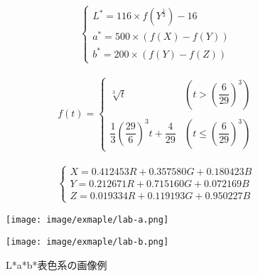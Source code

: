       \begin{eqnarray}
      \label{Lab表色系1}
        \left\{
          \begin{array}{l}
            L^* = 116 \times f(Y^{\frac{1}{3}}) - 16 \\
            a^* = 500 \times (f(X) - f(Y)) \\
            b^* = 200 \times (f(Y) - f(Z))
          \end{array}
        \right.
      \end{eqnarray}

      \begin{eqnarray}
        \label{Lab表色系2}
          f(t) = 
          \left\{
            \begin{array}{lll}
              \sqrt[3]{t} 
                &(t >    (\dfrac{6} {29})^3) \\ \\
              \dfrac{1} {3} (\dfrac{29} {6})^3 t + \dfrac{4} {29}
                &(t \leq (\dfrac{6} {29})^3)
            \end{array}
          \right.
      \end{eqnarray}

      \begin{eqnarray}
        \label{XYZ表色系}
        \left\{
          \begin{array}{l}
            X = 0.412453R + 0.357580G + 0.180423B \\
            Y = 0.212671R + 0.715160G + 0.072169B \\
            Z = 0.019334R + 0.119193G + 0.950227B
          \end{array}
        \right.
      \end{eqnarray}

      \begin{figure}[t]
        \begin{minipage}[c]{0.45\hsize}
          \centering
          \texttt{[image: image/exmaple/lab-a.png]}
        \end{minipage}
        \begin{minipage}[c]{0.45\hsize}
          \centering
          \texttt{[image: image/exmaple/lab-b.png]}
        \end{minipage}
        \caption{L*a*b*表色系の画像例}
        \label{Lab画像}
      \end{figure}


